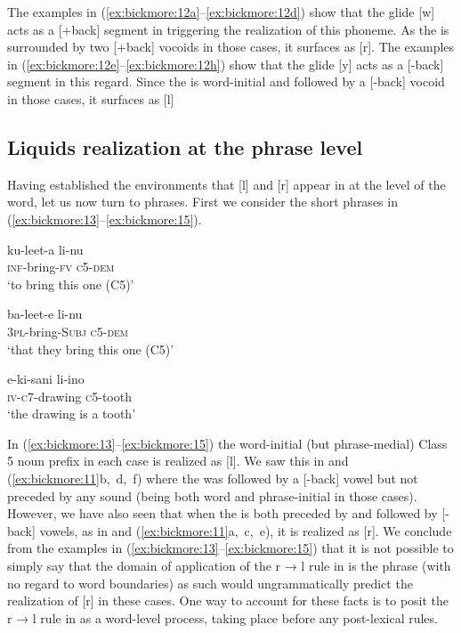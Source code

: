\documentclass[output=paper
,newtxmath
,modfonts
,nonflat]{langsci/langscibook}
\begin{document}
The examples in (\ref{ex:bickmore:12a}--\ref{ex:bickmore:12d}) show that the glide [w] acts as a [+back] segment in triggering the realization of this  phoneme. As the  is surrounded by two [+back] vocoids in those cases, it surfaces as [r]. The examples in (\ref{ex:bickmore:12e}--\ref{ex:bickmore:12h}) show that the glide [y] acts as a [-back] segment in this regard. Since the  is word-initial and followed by a [-back] vocoid in those cases, it surfaces as [l]

\subsection{Liquids realization at the phrase level}

Having established the environments that [l] and [r] appear in at the level of the word, let us now turn to phrases. First we consider the short phrases in (\ref{ex:bickmore:13}--\ref{ex:bickmore:15}).

\ea\label{ex:bickmore:13}
\gll  ku-leet-a li-nu  \\
\textsc{inf-}\textup{bring}\textsc{{}-fv} \textsc{c5-dem}\\
\glt  ‘to bring this one (C5)’  
\z

\ea\label{ex:bickmore:14}
\gll  ba-leet-e li-nu  \\
\textsc{3pl-}\textup{bring}\textsc{{}-Subj} \textsc{c5-dem}\\
\glt  ‘that they bring this one (C5)’
\z

\ea\label{ex:bickmore:15}
\gll  e-ki-sani li-ino  \\
\textsc{iv-c7-}\textup{drawing} \textsc{c5-}\textup{tooth}\\
\glt  ‘the drawing is a tooth’    
\z

In (\ref{ex:bickmore:13}--\ref{ex:bickmore:15}) the word-initial (but phrase-medial) Class 5 noun prefix in each case is realized as [l]. We saw this in  and (\ref{ex:bickmore:11}b,~d,~f) where the  was followed by a [-back] vowel but not preceded by any sound (being both word and phrase-initial in those cases). However, we have also seen that when the  is both preceded by and followed by [-back] vowels, as in  and (\ref{ex:bickmore:11}a,~c,~e), it is realized as [r]. We conclude from the examples in (\ref{ex:bickmore:13}--\ref{ex:bickmore:15}) that it is not possible to simply say that the domain of application of the r → l rule in  is the phrase (with no regard to word boundaries) as such would ungrammatically predict the realization of [r] in these cases. One way to account for these facts is to posit the r → l rule in  as a word-level process, taking place before any post-lexical rules. 
\end{document}
